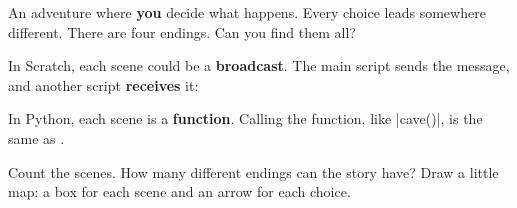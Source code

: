 
An adventure where \textbf{you} decide what happens. Every choice leads somewhere different. There are four endings. Can you find them all?

In Scratch, each scene could be a \textbf{broadcast}. The main script sends the message, and another script \textbf{receives} it:

\begin{center}
\begin{minipage}[t]{0.52\linewidth}
\begin{scratch}[scale=0.8]
\end{scratch}
\end{minipage}\hfill
\begin{minipage}[t]{0.44\linewidth}
\begin{scratch}[scale=0.8]
\end{scratch}
\end{minipage}
\end{center}

In Python, each scene is a \textbf{function}. Calling the function, like \py|cave()|, is the same as .

\begin{think}
Count the scenes. How many different endings can the story have? Draw a little map: a box for each scene and an arrow for each choice.
\end{think}

